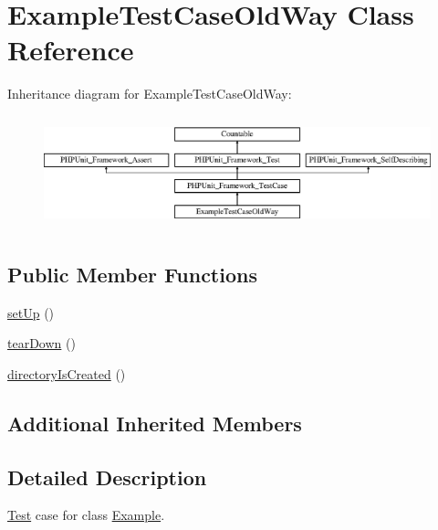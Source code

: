 \hypertarget{classorg_1_1bovigo_1_1vfs_1_1example_1_1_example_test_case_old_way}{}\section{Example\+Test\+Case\+Old\+Way Class Reference}
\label{classorg_1_1bovigo_1_1vfs_1_1example_1_1_example_test_case_old_way}
Inheritance diagram for Example\+Test\+Case\+Old\+Way\+:\begin{figure}[H]
\begin{center}
\leavevmode
\includegraphics[height=3.303835cm]{classorg_1_1bovigo_1_1vfs_1_1example_1_1_example_test_case_old_way}
\end{center}
\end{figure}
\subsection*{Public Member Functions}
\begin{DoxyCompactItemize}
\item 
\mbox{\hyperlink{classorg_1_1bovigo_1_1vfs_1_1example_1_1_example_test_case_old_way_a0bc688732d2b3b162ffebaf7812e78da}{set\+Up}} ()
\item 
\mbox{\hyperlink{classorg_1_1bovigo_1_1vfs_1_1example_1_1_example_test_case_old_way_a80fe3d17e658907fc75346a0ec9d6fc7}{tear\+Down}} ()
\item 
\mbox{\hyperlink{classorg_1_1bovigo_1_1vfs_1_1example_1_1_example_test_case_old_way_ac7f8f5444c4b0b2163d0b49fd5ee3349}{directory\+Is\+Created}} ()
\end{DoxyCompactItemize}
\subsection*{Additional Inherited Members}


\subsection{Detailed Description}
\mbox{\hyperlink{class_test}{Test}} case for class \mbox{\hyperlink{classorg_1_1bovigo_1_1vfs_1_1example_1_1_example}{Example}}. 

